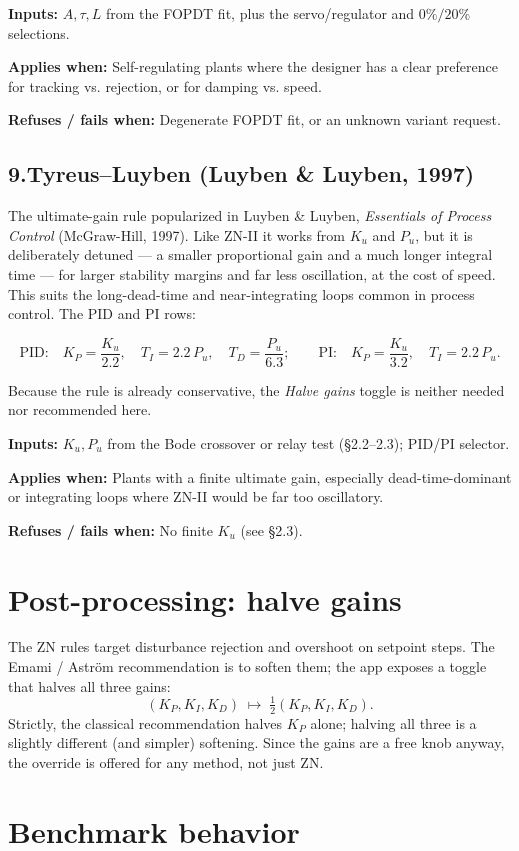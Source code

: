 \documentclass[11pt]{article}
\newcommand{\keybox}[1]{%
  \par\vspace{0.4em}%
  \noindent\colorbox{boxbg}{%
    \begin{minipage}{\dimexpr\linewidth-2\fboxsep\relax}%
      \vspace{0.3em}#1\vspace{0.3em}%
    \end{minipage}}%
  \par\vspace{0.4em}%
}
\newcommand{\applies}[1]{\smallskip\noindent\textbf{Applies when:} #1\par}
\newcommand{\refuses}[1]{\noindent\textbf{Refuses / fails when:} #1\par}
\newcommand{\inputs}[1]{\noindent\textbf{Inputs:} #1\par}
\begin{document}
\inputs{$A,\tau,L$ from the FOPDT fit, plus the servo/regulator and
$0\%/20\%$ selections.}
\applies{Self-regulating plants where the designer has a clear preference for
tracking vs. rejection, or for damping vs. speed.}
\refuses{Degenerate FOPDT fit, or an unknown variant request.}

\subsection{9.\quad Tyreus--Luyben (Luyben \& Luyben, 1997)}

The ultimate-gain rule popularized in Luyben \& Luyben, \emph{Essentials of
Process Control} (McGraw-Hill, 1997). Like ZN-II it works from $K_u$ and
$P_u$, but it is deliberately detuned --- a smaller proportional gain and a
much longer integral time --- for larger stability margins and far less
oscillation, at the cost of speed. This suits the long-dead-time and
near-integrating loops common in process control. The PID and PI rows:
\keybox{\[
  \text{PID:}\quad
  K_P = \frac{K_u}{2.2},\quad T_I = 2.2\,P_u,\quad T_D = \frac{P_u}{6.3};
  \qquad
  \text{PI:}\quad
  K_P = \frac{K_u}{3.2},\quad T_I = 2.2\,P_u.
\]}
Because the rule is already conservative, the \emph{Halve gains} toggle is
neither needed nor recommended here.

\inputs{$K_u, P_u$ from the Bode crossover or relay test (\S2.2--2.3); PID/PI
selector.}
\applies{Plants with a finite ultimate gain, especially dead-time-dominant or
integrating loops where ZN-II would be far too oscillatory.}
\refuses{No finite $K_u$ (see \S2.3).}

\section{Post-processing: halve gains}
\label{sec:halve}

The ZN rules target disturbance rejection and overshoot on setpoint steps. The
Emami / Aström recommendation is to soften them; the app exposes a toggle that
halves all three gains:
\[
  (K_P, K_I, K_D) \;\longmapsto\; \tfrac12 (K_P, K_I, K_D).
\]
Strictly, the classical recommendation halves $K_P$ alone; halving all three
is a slightly different (and simpler) softening. Since the gains are a free
knob anyway, the override is offered for any method, not just ZN.

\section{Benchmark behavior}
\end{document}
